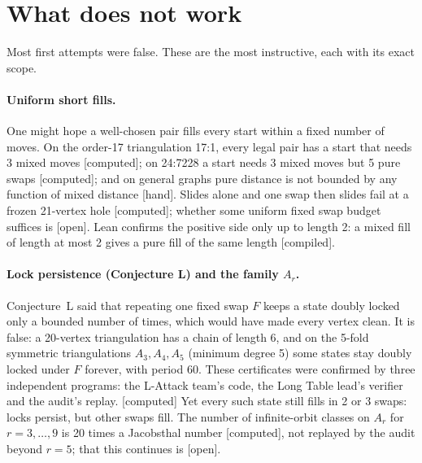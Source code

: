 \documentclass[11pt]{article}
\newcommand{\lab}[1]{\textsf{[#1]}}
\begin{document}
\section{What does not work}\label{sec:neg}
Most first attempts were false. These are the most instructive, each with its exact scope.

\paragraph{Uniform short fills.} One might hope a well-chosen pair fills every start within a fixed number of moves. On the order-17 triangulation 17:1, every legal pair has a start that needs 3 mixed moves \lab{computed}; on 24:7228 a start needs 3 mixed moves but 5 pure swaps \lab{computed}; and on general graphs pure distance is not bounded by any function of mixed distance \lab{hand}. Slides alone and one swap then slides fail at a frozen 21-vertex hole \lab{computed}; whether some uniform fixed swap budget suffices is \lab{open}. Lean confirms the positive side only up to length 2: a mixed fill of length at most 2 gives a pure fill of the same length \lab{compiled}.

\paragraph{Lock persistence (Conjecture L) and the family $A_r$.} Conjecture~L said that repeating one fixed swap $F$ keeps a state doubly locked only a bounded number of times, which would have made every vertex clean. It is false: a 20-vertex triangulation has a chain of length 6, and on the 5-fold symmetric triangulations $A_3,A_4,A_5$ (minimum degree 5) some states stay doubly locked under $F$ forever, with period 60. These certificates were confirmed by three independent programs: the L-Attack team's code, the Long Table lead's verifier and the audit's replay. \lab{computed} Yet every such state still fills in 2 or 3 swaps: locks persist, but other swaps fill. The number of infinite-orbit classes on $A_r$ for $r=3,\dots,9$ is 20 times a Jacobsthal number \lab{computed}, not replayed by the audit beyond $r=5$; that this continues is \lab{open}.
\end{document}
